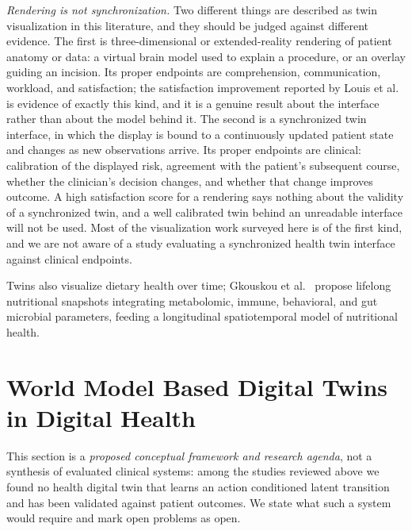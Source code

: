 \documentclass[journal]{IEEEtran}
\newif\ifsubmission
\begin{document}
\emph{Rendering is not synchronization.} Two different things are described as twin visualization in this literature, and they should be judged against different evidence. The first is three-dimensional or extended-reality rendering of patient anatomy or data: a virtual brain model used to explain a procedure, or an overlay guiding an incision. Its proper endpoints are comprehension, communication, workload, and satisfaction; the satisfaction improvement reported by Louis et al.~\cite{Louis2021VR} is evidence of exactly this kind, and it is a genuine result about the interface rather than about the model behind it. The second is a synchronized twin interface, in which the display is bound to a continuously updated patient state and changes as new observations arrive. Its proper endpoints are clinical: calibration of the displayed risk, agreement with the patient's subsequent course, whether the clinician's decision changes, and whether that change improves outcome. A high satisfaction score for a rendering says nothing about the validity of a synchronized twin, and a well calibrated twin behind an unreadable interface will not be used. Most of the visualization work surveyed here is of the first kind, and we are not aware of a study evaluating a synchronized health twin interface against clinical endpoints.

Twins also visualize dietary health over time; Gkouskou et al.~\cite{gkouskou2020virtual} propose lifelong nutritional snapshots integrating metabolomic, immune, behavioral, and gut microbial parameters, feeding a longitudinal spatiotemporal model of nutritional health.

\fi

\section{World Model Based Digital Twins in Digital Health}
\label{sec:world_model_dt}
\ifsubmission
This section is a \emph{proposed conceptual framework and research agenda}, not a synthesis of evaluated clinical systems: among the studies reviewed above we found no health digital twin that learns an action conditioned latent transition and has been validated against patient outcomes. We state what such a system would require and mark open problems as open.
\end{document}
